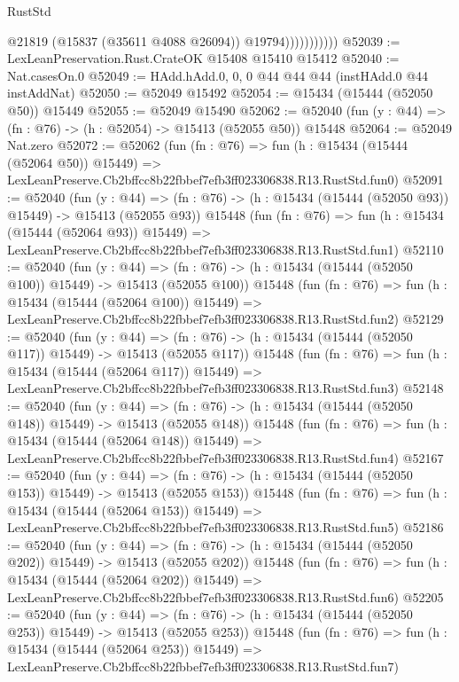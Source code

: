 \begin{lexlean}{RustStd}
\begin{coremodule}
                          @21819
                          (@15837 (@35611 @4088 @26094))
                          @19794)))))))))))
@52039 := LexLeanPreservation.Rust.CrateOK @15408 @15410 @15412
@52040 := Nat.casesOn.{0}
@52049 := HAdd.hAdd.{0, 0, 0} @44 @44 @44 (instHAdd.{0} @44 instAddNat)
@52050 := @52049 @15492
@52054 := @15434 (@15444 (@52050 @50)) @15449
@52055 := @52049 @15490
@52062 := @52040 (fun (y : @44) => (fn : @76) -> (h : @52054) -> @15413 (@52055 @50)) @15448
@52064 := @52049 Nat.zero
@52072 := @52062
    (fun (fn : @76) =>
    fun (h : @15434 (@15444 (@52064 @50)) @15449) =>
    LexLeanPreserve.Cb2bffcc8b22fbbef7efb3ff023306838.R13.RustStd.fun0)
@52091 := @52040
    (fun (y : @44) =>
    (fn : @76) -> (h : @15434 (@15444 (@52050 @93)) @15449) -> @15413 (@52055 @93))
    @15448
    (fun (fn : @76) =>
    fun (h : @15434 (@15444 (@52064 @93)) @15449) =>
    LexLeanPreserve.Cb2bffcc8b22fbbef7efb3ff023306838.R13.RustStd.fun1)
@52110 := @52040
    (fun (y : @44) =>
    (fn : @76) -> (h : @15434 (@15444 (@52050 @100)) @15449) -> @15413 (@52055 @100))
    @15448
    (fun (fn : @76) =>
    fun (h : @15434 (@15444 (@52064 @100)) @15449) =>
    LexLeanPreserve.Cb2bffcc8b22fbbef7efb3ff023306838.R13.RustStd.fun2)
@52129 := @52040
    (fun (y : @44) =>
    (fn : @76) -> (h : @15434 (@15444 (@52050 @117)) @15449) -> @15413 (@52055 @117))
    @15448
    (fun (fn : @76) =>
    fun (h : @15434 (@15444 (@52064 @117)) @15449) =>
    LexLeanPreserve.Cb2bffcc8b22fbbef7efb3ff023306838.R13.RustStd.fun3)
@52148 := @52040
    (fun (y : @44) =>
    (fn : @76) -> (h : @15434 (@15444 (@52050 @148)) @15449) -> @15413 (@52055 @148))
    @15448
    (fun (fn : @76) =>
    fun (h : @15434 (@15444 (@52064 @148)) @15449) =>
    LexLeanPreserve.Cb2bffcc8b22fbbef7efb3ff023306838.R13.RustStd.fun4)
@52167 := @52040
    (fun (y : @44) =>
    (fn : @76) -> (h : @15434 (@15444 (@52050 @153)) @15449) -> @15413 (@52055 @153))
    @15448
    (fun (fn : @76) =>
    fun (h : @15434 (@15444 (@52064 @153)) @15449) =>
    LexLeanPreserve.Cb2bffcc8b22fbbef7efb3ff023306838.R13.RustStd.fun5)
@52186 := @52040
    (fun (y : @44) =>
    (fn : @76) -> (h : @15434 (@15444 (@52050 @202)) @15449) -> @15413 (@52055 @202))
    @15448
    (fun (fn : @76) =>
    fun (h : @15434 (@15444 (@52064 @202)) @15449) =>
    LexLeanPreserve.Cb2bffcc8b22fbbef7efb3ff023306838.R13.RustStd.fun6)
@52205 := @52040
    (fun (y : @44) =>
    (fn : @76) -> (h : @15434 (@15444 (@52050 @253)) @15449) -> @15413 (@52055 @253))
    @15448
    (fun (fn : @76) =>
    fun (h : @15434 (@15444 (@52064 @253)) @15449) =>
    LexLeanPreserve.Cb2bffcc8b22fbbef7efb3ff023306838.R13.RustStd.fun7)

\end{coremodule}
\end{lexlean}
